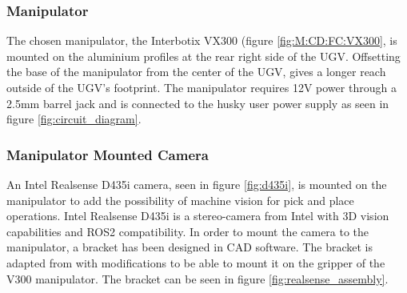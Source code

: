 \subsubsection{Manipulator}\label{sec:M:H:P&PH:Manipulator}
The chosen manipulator, the Interbotix VX300 (figure \ref{fig:M:CD:FC:VX300}, is mounted on the aluminium profiles at the rear right side of the UGV. Offsetting the base of the manipulator from the center of the UGV, gives a longer reach outside of the UGV's footprint. The manipulator requires 12V power through a 2.5mm barrel jack and is connected to the husky user power supply as seen in figure \ref{fig:circuit_diagram}.

\subsubsection{Manipulator Mounted Camera}\label{sec:M:H:P&PH:ManipulatorMountedCamera}
An Intel Realsense D435i camera, seen in figure \ref{fig:d435i}, is mounted on the manipulator to add the possibility of machine vision for pick and place operations. Intel Realsense D435i is a stereo-camera from Intel with 3D vision capabilities and ROS2 compatibility. In order to mount the camera to the manipulator, a bracket has been  designed in CAD software. The bracket is adapted from \cite{d435_sleeve} with modifications to be able to mount it on the gripper of the V300 manipulator. The bracket can be seen in figure \ref{fig:realsense_assembly}.

